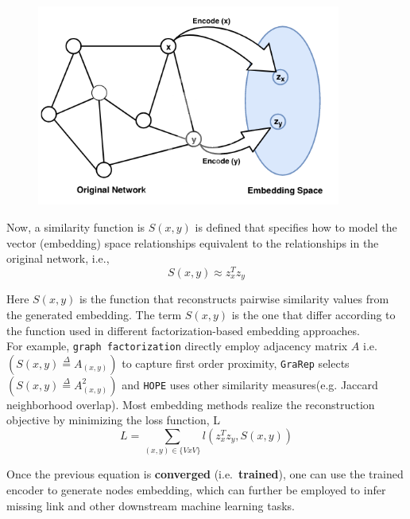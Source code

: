 \begin{figure}[H]
    \centering
    \includegraphics[width=10cm, keepaspectratio]{capitoli/methods/imgs/img5.png}
\end{figure}

Now, a similarity function is \(S(x, y)\) is defined that specifies how
to model the vector (embedding) space relationships equivalent to the
relationships in the original network, i.e.,
\[S(x, y) \approx z_x^T z_y\]

Here \(S(x, y)\) is the function that reconstructs pairwise similarity
values from the generated embedding. The term \(S(x, y)\) is the one
that differ according to the function used in different
factorization-based embedding approaches.\\

For example, \texttt{graph\ factorization} directly employ adjacency
matrix \(A\) i.e.~\((S(x, y) \overset{\Delta}{=} A_{(x,y)})\) to capture
first order proximity, \texttt{GraRep} selects
\((S(x, y) \overset{\Delta}{=} A^2_{(x,y)})\) and \texttt{HOPE} uses
other similarity measures(e.g. Jaccard neighborhood overlap). Most
embedding methods realize the reconstruction objective by minimizing the
loss function, L
\[L = \sum_{(x, y) \in \{V x V \}} l(z_x^T z_y, S(x, y))\]

Once the previous equation is \textbf{converged}
(i.e.~\textbf{trained}), one can use the trained encoder to generate
nodes embedding, which can further be employed to infer missing link and
other downstream machine learning tasks.\\

